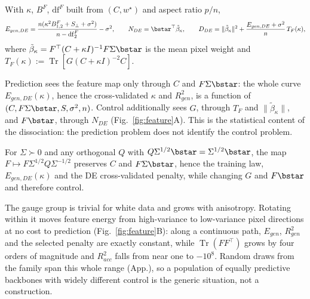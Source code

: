 \begin{prop}\label{prop:feature-de}\label{prop:linfeat_acc_ND}\label{prop:linfeat_gen_err}
With $\kappa$, $B^F$, $\mathrm{df}^F$ built from $(C,w^\star)$ and aspect ratio $p/n$,
\begin{equation}
E_{gen,DE}=\frac{n(\kappa^2B^F_{1,2}+S_\perp+\sigma^2)}{n-\mathrm{df}^F_2}-\sigma^2,\qquad
N_{DE}={\bstar}^\top\tilde\beta_\kappa,\qquad
D_{DE}=\|\tilde\beta_\kappa\|^2+\frac{E_{gen,DE}+\sigma^2}{n}\,T_F(\kappa),
\label{eq:feature-de}
\end{equation}
where $\tilde\beta_\kappa=F^\top(C+\kappa I)^{-1}F\Sigma\bstar$ is the mean pixel weight and
$T_F(\kappa):=\operatorname{Tr}[G(C+\kappa I)^{-2}C]$.
\end{prop}
Prediction sees the feature map only through $C$ and $F\Sigma\bstar$: the whole curve $E_{gen,DE}(\kappa)$, hence the cross-validated $\kappa$ and $R^2_{gen}$, is a function of $(C,F\Sigma\bstar,S,\sigma^2,n)$. Control additionally sees $G$, through $T_F$ and $\|\tilde\beta_\kappa\|$, and $F\bstar$, through $N_{DE}$ (Fig.~\ref{fig:feature}A). This is the statistical content of the dissociation: the prediction problem does not identify the control problem.

\begin{prop}\label{prop:gauge}
For $\Sigma\succ0$ and any orthogonal $Q$ with $Q\Sigma^{1/2}\bstar=\Sigma^{1/2}\bstar$, the map $F\mapsto F\Sigma^{1/2}Q\Sigma^{-1/2}$ preserves $C$ and $F\Sigma\bstar$, hence the training law, $E_{gen,DE}(\kappa)$ and the DE cross-validated penalty, while changing $G$ and $F\bstar$ and therefore control.
\end{prop}
The gauge group is trivial for white data and grows with anisotropy. Rotating within it moves feature energy from high-variance to low-variance pixel directions at no cost to prediction (Fig.~\ref{fig:feature}B): along a continuous path, $E_{gen}$, $R^2_{gen}$ and the selected penalty are exactly constant, while $\operatorname{Tr}(FF^\top)$ grows by four orders of magnitude and $R^2_{acc}$ falls from near one to $-10^{8}$. Random draws from the family span this whole range (App.), so a population of equally predictive backbones with widely different control is the generic situation, not a construction.

